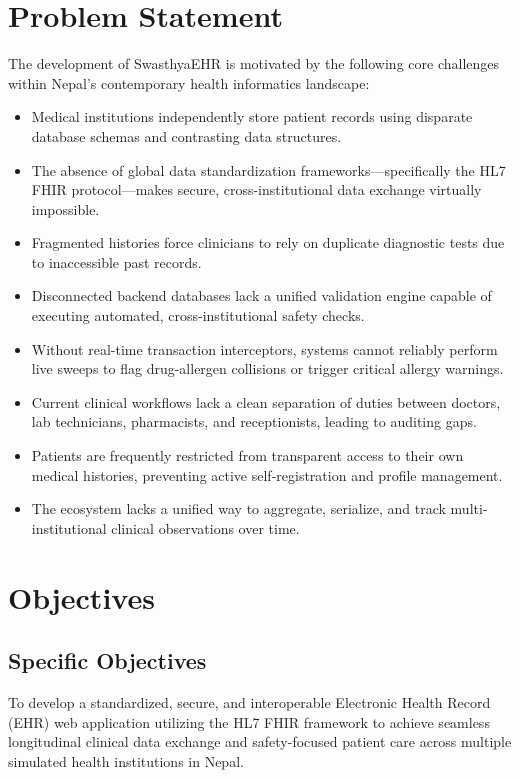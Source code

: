 \documentclass[12pt, a4paper]{report}
\numberwithin{equation}{chapter}
\begin{document}
\section{Problem Statement}
The development of SwasthyaEHR is motivated by the following core challenges within Nepal's contemporary health informatics landscape:
\begin{itemize}
    \item Medical institutions independently store patient records using disparate database schemas and contrasting data structures.
    \item The absence of global data standardization frameworks—specifically the HL7 FHIR protocol—makes secure, cross-institutional data exchange virtually impossible.
    \item Fragmented histories force clinicians to rely on duplicate diagnostic tests due to inaccessible past records.
    \item Disconnected backend databases lack a unified validation engine capable of executing automated, cross-institutional safety checks.
    \item Without real-time transaction interceptors, systems cannot reliably perform live sweeps to flag drug-allergen collisions or trigger critical allergy warnings.
    \item Current clinical workflows lack a clean separation of duties between doctors, lab technicians, pharmacists, and receptionists, leading to auditing gaps.
    \item Patients are frequently restricted from transparent access to their own medical histories, preventing active self-registration and profile management.
    \item The ecosystem lacks a unified way to aggregate, serialize, and track multi-institutional clinical observations over time.
\end{itemize}

\clearpage
\section{Objectives}


\subsection{Specific Objectives}
To develop a standardized, secure, and interoperable Electronic Health Record (EHR) web application utilizing the HL7 FHIR framework to achieve seamless longitudinal clinical data exchange and safety-focused patient care across multiple simulated health institutions in Nepal.
\end{document}
